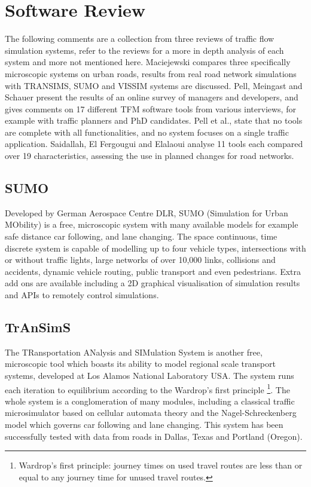 \section{Software Review}

	The following comments are a collection from three reviews of traffic flow simulation systems, refer to the reviews for a more in depth analysis of each system and more not mentioned here. Maciejewski \cite{Maciejewski10} compares three specifically microscopic systems on urban roads, results from real road network simulations with TRANSIMS, SUMO and VISSIM systems are discussed. Pell, Meingast and Schauer \cite{Pell17} present the results of an online survey of managers and developers, and gives comments on 17 different TFM software tools from various interviews, for example with traffic planners and PhD candidates. Pell et al., state that no tools are complete with all functionalities, and no system focuses on a single traffic application. Saidallah, El Fergougui and Elalaoui \cite{Saidallah16} analyse 11 tools each compared over 19 characteristics, assessing the use in planned changes for road networks.


\subsection*{SUMO}

	Developed by German Aerospace Centre DLR, SUMO (Simulation for Urban MObility) is a free, microscopic system with many available models for example safe distance car following, and lane changing. The space continuous, time discrete system is capable of modelling up to four vehicle types, intersections with or without traffic lights, large networks of over 10,000 links, collisions and accidents, dynamic vehicle routing, public transport and even pedestrians. Extra add ons are available including a 2D graphical visualisation of simulation results and APIs to remotely control simulations.
	
\subsection*{TrAnSimS}

	The TRansportation ANalysis and SIMulation System is another free, microscopic tool which boasts its ability to model regional scale transport systems, developed at Los Alamos National Laboratory USA. The system runs each iteration to equilibrium according to the Wardrop’s first principle \footnote{Wardrop's first principle: journey times on used travel routes are less than or equal to any journey time for unused travel routes.}. The whole system is a conglomeration of many modules, including a classical traffic microsimulator based on cellular automata theory and the Nagel-Schreckenberg model which governs car following and lane changing. This system has been successfully tested with data from roads in Dallas, Texas and Portland (Oregon). 

